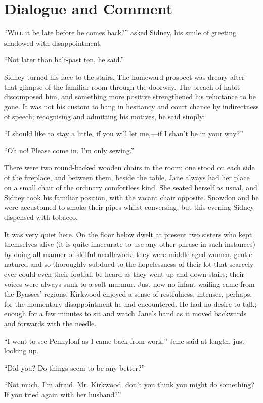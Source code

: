 \chapter{Dialogue and Comment}

\textsc{``Will} it be late before he comes back?'' asked Sidney, his
smile of greeting shadowed with disappointment.

``Not later than half-past ten, he said.''

Sidney turned his face to the stairs. The homeward prospect was dreary
after that glimpse of the familiar room through the doorway. The breach
of habit discomposed him, and something more positive strengthened his
reluctance to be gone. It was not his custom to hang in hesitancy and
court chance by indirectness of speech; recognising and admitting his
motives, he said simply:

``I should like to stay a little, if you will let me,---if I shan't be
in your way?''

{}``Oh no! Please come in. I'm only sewing.''

There were two round-backed wooden chairs in the room; one stood on each
side of the fireplace, and between them, beside the table, Jane always
had her place on a small chair of the ordinary comfortless kind. She
seated herself as usual, and Sidney took his familiar position, with the
vacant chair opposite. Snowdon and he were accustomed to smoke their
pipes whilst conversing, but this evening Sidney dispensed with tobacco.

It was very quiet here. On the floor below dwelt at present two sisters
who kept themselves alive (it is quite inaccurate to use any other
phrase in such instances) by doing all manner of skilful needlework;
they were middle-aged women, gentle-natured and so thoroughly subdued to
the hopelessness of their lot that scarcely ever could even their
footfall be heard as they went up and down stairs; their voices were
always sunk to a soft murmur. Just now no infant wailing came from the
Byasses' regions. Kirkwood {}enjoyed a sense of restfulness, intenser,
perhaps, for the momentary disappointment he had encountered. He had no
desire to talk; enough for a few minutes to sit and watch Jane's hand as
it moved backwards and forwards with the needle.

``I went to see Pennyloaf as I came back from work,'' Jane said at
length, just looking up.

``Did you? Do things seem to be any better?''

``Not much, I'm afraid. Mr. Kirkwood, don't you think you might do
something? If you tried again with her husband?''


